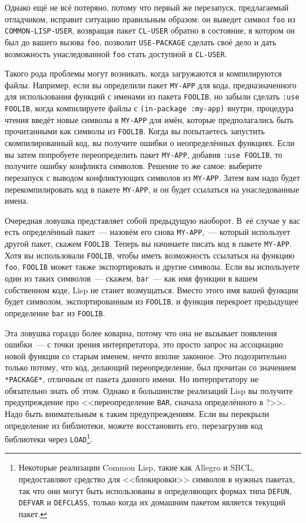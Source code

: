 Однако ещё не всё потеряно, потому что первый же перезапуск, предлагаемый отладчиком,
исправит ситуацию правильным образом: он выведет символ \lstinline{foo} из
\lstinline{COMMON-LISP-USER}, возвращая пакет \lstinline{CL-USER} обратно в состояние, в котором он
был до вашего вызова \lstinline{foo}, позволит \lstinline{USE-PACKAGE} сделать своё дело и дать
возможность унаследованной \lstinline{foo} стать доступной в \lstinline{CL-USER}.

Такого рода проблемы могут возникать, когда загружаются и компилируются файлы. Например,
если вы определили пакет \lstinline{MY-APP} для кода, предназначенного для использования
функций с именами из пакета \lstinline{FOOLIB}, но забыли сделать \lstinline{:use FOOLIB}, когда
компилируете файлы с \lstinline{(in-package :my-app)} внутри, процедура чтения введёт новые символы
в \lstinline{MY-APP} для имён, которые предполагались быть прочитанными как символы из
\lstinline{FOOLIB}. Когда вы попытаетесь запустить скомпилированный код, вы получите ошибки о
неопределённых функциях. Если вы затем попробуете переопределить пакет \lstinline{MY-APP},
добавив \lstinline{:use FOOLIB}, то получите ошибку конфликта символов. Решение то же самое:
выберите перезапуск с выводом конфликтующих символов из \lstinline{MY-APP}. Затем вам надо
будет перекомпилировать код в пакете \lstinline{MY-APP}, и он будет ссылаться на унаследованные
имена.

Очередная ловушка представляет собой предыдущую наоборот. В~её случае у вас есть
определённый пакет~--- назовём его снова \lstinline{MY-APP},~--- который использует другой
пакет, скажем \lstinline{FOOLIB}. Теперь вы начинаете писать код в пакете \lstinline{MY-APP}. Хотя
вы использовали \lstinline{FOOLIB}, чтобы иметь возможность ссылаться на функцию \lstinline{foo},
\lstinline{FOOLIB} может также экспортировать и другие символы. Если вы используете один из
таких символов~--- скажем, \lstinline{bar}~--- как имя функции в вашем собственном коде, Lisp
не станет возмущаться. Вместо этого имя вашей функции будет символом, экспортированным из
\lstinline{FOOLIB}, и функция перекроет предыдущее определение \lstinline{bar} из \lstinline{FOOLIB}.

Эта ловушка гораздо более коварна, потому что она не вызывает появления ошибки~--- с точки
зрения интерпретатора, это просто запрос на ассоциацию новой функции со старым именем,
нечто вполне законное. Это подозрительно только потому, что код, делающий переопределение,
был прочитан со значением \lstinline{*PACKAGE*}, отличным от пакета данного имени. Но
интерпретатору не обязательно знать об этом. Однако в большинстве реализаций Lisp вы получите
предупреждение про <<переопределение \lstinline{BAR}, сначала определённого в ?>>. Надо быть
внимательным к таким предупреждениям. Если вы перекрыли определение из библиотеки, можете
восстановить его, перезагрузив код библиотеки через \lstinline{LOAD}\footnote{Некоторые
  реализации Common Lisp, такие как Allegro и SBCL, предоставляют средство для
  <<блокировки>> символов в нужных пакетах, так что они могут быть использованы в
  определяющих формах типа \lstinline{DEFUN}, \lstinline{DEFVAR} и \lstinline{DEFCLASS}, только когда их
  домашним пакетом является текущий пакет.}\hspace{\footnotenegspace}.

